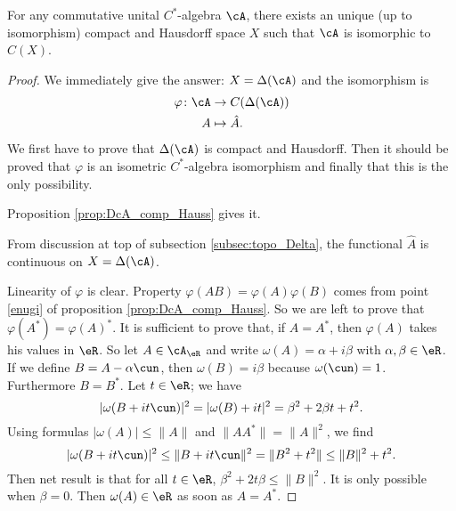 \begin{theorem}    

For any commutative unital $C^*$-algebra $\cA$, there exists an unique (up to isomorphism) compact and Hausdorff space $X$ such that  $\cA$ is isomorphic to $C(X)$.
\label{thoGelfand}
\end{theorem}

\begin{proof}
We immediately give the answer: $X=\Delta(\cA)$ and the isomorphism is
        \begin{equation}
        \begin{aligned}
            \varphi \colon \cA &\to C(\Delta(\cA))\\
            A&\mapsto \hat A.
        \end{aligned}
    \end{equation}  
We first have to prove that $\Delta(\cA)$ is compact and Hausdorff. Then it should be proved that $\varphi$ is an isometric $C^*$-algebra isomorphism and finally that this is the only possibility.


Proposition \ref{prop:DcA_comp_Hauss} gives it.


From discussion at top of subsection \ref{subsec:topo_Delta}, the functional $\hat A$ is continuous on $X=\Delta(\cA)$.


Linearity of $\varphi$ is clear. Property $\varphi(AB)=\varphi(A)\varphi(B)$ comes from point \ref{enugi} of proposition \ref{prop:DcA_comp_Hauss}. So we are left to prove that $\varphi(A^*)=\varphi(A)^*$. It is sufficient to prove that, if $A=A^*$, then $\varphi(A)$ takes his values in $\eR$. So let $A\in\cA_{\eR}$ and write $\omega(A)=\alpha+i\beta$ with $\alpha,\beta\in\eR$. If we define $B=A-\alpha\cun$, then $\omega(B)=i\beta$ because $\omega(\cun)=1$. Furthermore $B=B^*$. Let $t\in\eR$; we have
\begin{equation}  \label{eq:rcinq}
|\omega(B+it\cun)|^2=|\omega(B)+it|^2
                    =\beta^2+2\beta t+t^2.
\end{equation}
Using formulas $|\omega(A)|\leq\|A\|$ and $\|AA^*\|=\|A\|^2$, we find
\begin{equation}
  |\omega(B+it\cun)|^2\leq\|B+it\cun\|^2
                      =\|B^2+t^2\|
                      \leq \|B\|^2+t^2.
\end{equation}
Then net result is that for all $t\in\eR$,   $\beta^2+2t\beta\leq \|B\|^2$. It is only possible when $\beta=0$. Then $\omega(A)\in\eR$ as soon as $A=A^*$.


\end{proof}
